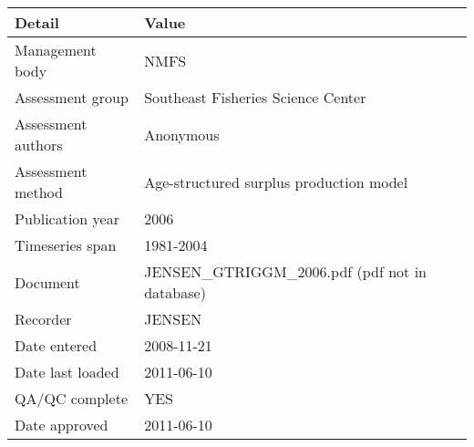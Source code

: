 \begin{table}[htb]
\centering
\begin{tabular}{lp{7cm}}
\toprule
Detail & Value \\
\midrule
Management body    & NMFS                                            \\
Assessment group   & Southeast Fisheries Science Center              \\
Assessment authors & Anonymous                                       \\
Assessment method  & Age-structured surplus production model         \\
Publication year   & 2006                                            \\
Timeseries span    & 1981-2004                                       \\
Document           & JENSEN\_GTRIGGM\_2006.pdf (pdf not in database) \\
Recorder           & JENSEN                                          \\
Date entered       & 2008-11-21                                      \\
Date last loaded   & 2011-06-10                                      \\
QA/QC complete     & YES                                             \\
Date approved      & 2011-06-10                                      \\
\bottomrule
\end{tabular}
\label{tab:assessdet}
\end{table}
